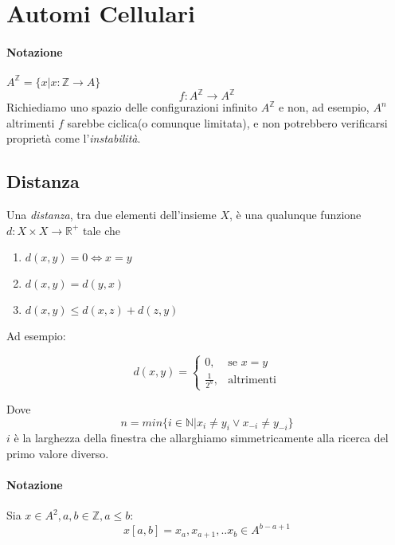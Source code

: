 \documentclass[12pt]{article}
\begin{document}
\maketitle

\section{Automi Cellulari}

\paragraph{Notazione} $A^\mathds{Z} = \{ x | x: \mathds{Z} \rightarrow A\}$
$$ f: A^\mathds{Z} \rightarrow A^\mathds{Z} $$
Richiediamo uno spazio delle configurazioni infinito $A^\mathds{Z}$ e non, ad esempio, $A^n$ altrimenti $f$ sarebbe ciclica(o comunque limitata), e non potrebbero verificarsi proprietà come l'\textit{instabilità}.
\subsection{Distanza}
Una \textit{distanza}, tra due elementi dell'insieme $X$, è una qualunque funzione $d: X \times X \rightarrow \mathds{R}^{+}$ tale che

\begin{enumerate}
	\item $d(x,y) = 0 \Leftrightarrow x = y$
	\item $d(x,y) = d(y,x) $
	\item $d(x,y) \leq d(x,z) + d(z,y)$
\end{enumerate}

Ad esempio:


\begin{equation}    
d(x,y)= 
\begin{cases}
    0,& \text{se } x=y\\
    \frac{1}{2^n},              & \text{altrimenti}
\end{cases}
\end{equation}

Dove
$$n = min\{ i \in \mathds{N} | x_i \neq y_i \vee x_{-i} \neq y_{-i} \} $$ $i$ è la larghezza della finestra che allarghiamo simmetricamente alla ricerca del primo valore diverso.

\paragraph{Notazione} Sia $x \in A^2, a,b \in \mathds{Z}, a \leq b$:
$$x[a,b] = x_a, x_{a+1}, .. x_{b} \in A^{b-a+1}
$$
\end{document}
